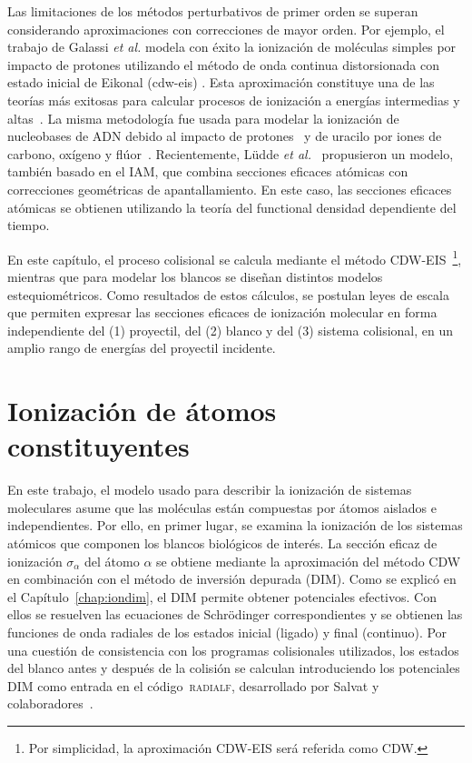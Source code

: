 Las limitaciones de los métodos perturbativos de primer orden se superan 
considerando aproximaciones con correcciones de mayor orden. 
Por ejemplo, el trabajo de Galassi \textit{et al.} \cite{Galassi:00} 
modela con éxito la ionización de moléculas simples por impacto de 
protones utilizando el método de onda continua distorsionada con estado 
inicial de Eikonal (\acs{cdw-eis}) \cite{Fainstein:88,Miraglia:08,
Miraglia:09}. Esta aproximación constituye una de las teorías más 
exitosas para calcular procesos de ionización a energías intermedias y 
altas~\cite{Miraglia:08,Miraglia:09,Montanari:17-iongasesnobles}. 
La misma metodología fue usada para modelar la ionización de nucleobases 
de ADN debido al impacto de protones~\cite{Galassi:12} y de uracilo por 
iones de carbono, oxígeno y flúor~\cite{champion2012,agnihotri2012,
agnihotri2013}. Recientemente, L\"udde \textit{et al.}~\cite{Ludde:16,
Ludde:18,Ludde:19,Ludde:20} propusieron un modelo, también basado en el 
IAM, que combina secciones eficaces atómicas con correcciones 
geométricas de apantallamiento. En este caso, las secciones eficaces 
atómicas se obtienen utilizando la teoría del functional densidad 
dependiente del tiempo. 

En este capítulo, el proceso colisional se calcula mediante el método 
CDW-EIS~\footnote{Por simplicidad, la aproximación CDW-EIS será referida 
como CDW.}, mientras que para modelar los blancos se diseñan distintos 
modelos estequiométricos. Como resultados de estos cálculos, se postulan 
leyes de escala que permiten expresar las secciones eficaces de 
ionización molecular en forma independiente del 
(1) proyectil, del (2) blanco y del (3) sistema colisional, en un 
amplio rango de energías del proyectil incidente.

\section{Ionización de átomos constituyentes}
\label{sec:atoms}

En este trabajo, el modelo usado para describir la ionización de 
sistemas moleculares asume que las moléculas están compuestas por átomos 
aislados e independientes. Por ello, en primer lugar, se examina la 
ionización de los sistemas atómicos que componen los blancos biológicos 
de interés. La sección eficaz de ionización $\sigma_{\alpha}$ del átomo 
$\alpha$ se obtiene mediante la aproximación del método CDW en 
combinación con el método de inversión depurada (DIM). Como se explicó 
en el Capítulo~\ref{chap:iondim}, el DIM permite obtener potenciales 
efectivos. Con ellos se resuelven las ecuaciones de Schr\"odinger 
correspondientes y se obtienen las funciones de onda radiales de los 
estados inicial (ligado) y final (continuo). Por una cuestión de 
consistencia con los programas colisionales utilizados, los estados del 
blanco antes y después de la colisión se calculan introduciendo los 
potenciales DIM como entrada en el código~\textsc{radialf}, desarrollado 
por Salvat y colaboradores~\cite{salvat1995}.

